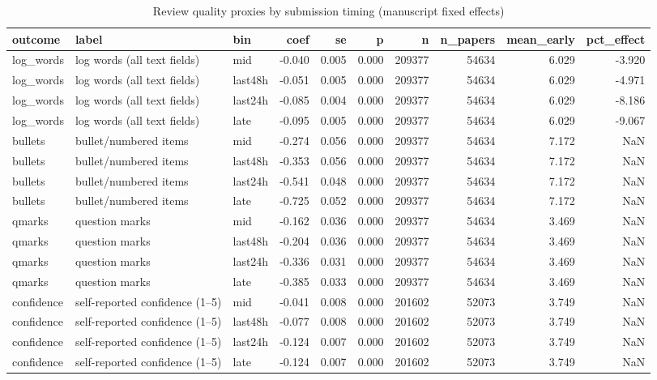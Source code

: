 \begin{table}
\caption{Review quality proxies by submission timing (manuscript fixed effects)}
\label{tab:quality}
\begin{tabular}{lllrrrrrrr}
\toprule
outcome & label & bin & coef & se & p & n & n\_papers & mean\_early & pct\_effect \\
\midrule
log\_words & log words (all text fields) & mid & -0.040 & 0.005 & 0.000 & 209377 & 54634 & 6.029 & -3.920 \\
log\_words & log words (all text fields) & last48h & -0.051 & 0.005 & 0.000 & 209377 & 54634 & 6.029 & -4.971 \\
log\_words & log words (all text fields) & last24h & -0.085 & 0.004 & 0.000 & 209377 & 54634 & 6.029 & -8.186 \\
log\_words & log words (all text fields) & late & -0.095 & 0.005 & 0.000 & 209377 & 54634 & 6.029 & -9.067 \\
bullets & bullet/numbered items & mid & -0.274 & 0.056 & 0.000 & 209377 & 54634 & 7.172 & NaN \\
bullets & bullet/numbered items & last48h & -0.353 & 0.056 & 0.000 & 209377 & 54634 & 7.172 & NaN \\
bullets & bullet/numbered items & last24h & -0.541 & 0.048 & 0.000 & 209377 & 54634 & 7.172 & NaN \\
bullets & bullet/numbered items & late & -0.725 & 0.052 & 0.000 & 209377 & 54634 & 7.172 & NaN \\
qmarks & question marks & mid & -0.162 & 0.036 & 0.000 & 209377 & 54634 & 3.469 & NaN \\
qmarks & question marks & last48h & -0.204 & 0.036 & 0.000 & 209377 & 54634 & 3.469 & NaN \\
qmarks & question marks & last24h & -0.336 & 0.031 & 0.000 & 209377 & 54634 & 3.469 & NaN \\
qmarks & question marks & late & -0.385 & 0.033 & 0.000 & 209377 & 54634 & 3.469 & NaN \\
confidence & self-reported confidence (1–5) & mid & -0.041 & 0.008 & 0.000 & 201602 & 52073 & 3.749 & NaN \\
confidence & self-reported confidence (1–5) & last48h & -0.077 & 0.008 & 0.000 & 201602 & 52073 & 3.749 & NaN \\
confidence & self-reported confidence (1–5) & last24h & -0.124 & 0.007 & 0.000 & 201602 & 52073 & 3.749 & NaN \\
confidence & self-reported confidence (1–5) & late & -0.124 & 0.007 & 0.000 & 201602 & 52073 & 3.749 & NaN \\

\end{tabular}
\end{table}
